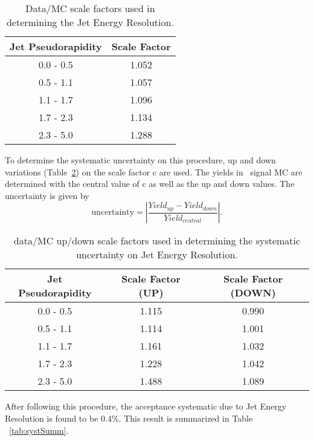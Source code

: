 \begin{table}[h]
\caption{ \label{tab:jer_scalefactor} Data/MC scale factors used in determining the Jet Energy Resolution.}
\begin{center}
\begin{tabular}{c|c}\hline
Jet Pseudorapidity & Scale Factor \\ \hline \hline
0.0 - 0.5 & 1.052 \\
0.5 - 1.1 & 1.057 \\
1.1 - 1.7 & 1.096 \\
1.7 - 2.3 & 1.134 \\
2.3 - 5.0 & 1.288 \\
\hline
\hline
\end{tabular}
\end{center}
\end{table}

To determine the systematic uncertainty on this procedure, up and down variations (Table~\ref{tab:jer_scalefactor_updown}) on the scale factor c are used. The yields in \ttZ \ signal MC are determined with the central value of c as well as the up and down values. The uncertainty is given by
\begin{equation}
\mathrm{uncertainty} = \left| \frac{Yield _{up} - Yield _{down}}{Yield _{central}} \right|.
\end{equation}

\begin{table}[h]
\caption{ \label{tab:jer_scalefactor_updown} data/MC up/down scale factors used in determining the systematic uncertainty on Jet Energy Resolution.}
\begin{center}
\begin{tabular}{c|c|c}\hline
Jet Pseudorapidity & Scale Factor (UP) & Scale Factor (DOWN)\\ \hline \hline
0.0 - 0.5 & 1.115 & 0.990 \\
0.5 - 1.1 & 1.114 & 1.001 \\
1.1 - 1.7 & 1.161 & 1.032 \\
1.7 - 2.3 & 1.228 & 1.042 \\
2.3 - 5.0 & 1.488 & 1.089 \\
\hline
\hline
\end{tabular}
\end{center}
\end{table}

After following this procedure, the acceptance systematic due to Jet Energy Resolution is found to be 0.4\%. This result is summarized in Table ~\ref{tab:systSumm}.\\


